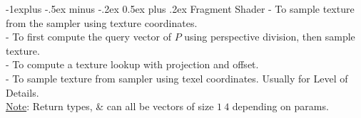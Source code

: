 \documentclass[10pt,landscape,letterpaper]{article}
\makeatletter
\renewcommand{\subsection}{\@startsection{subsection}{2}{0mm}%
                                {-1explus -.5ex minus -.2ex}%
                                {0.5ex plus .2ex}%
                                {\sffamily\normalsize\itshape}}
\makeatother
\begin{document}
\begin{multicols}{3}
\subsection{Fragment Shader}
 - To sample texture from the sampler using texture coordinates.
\\
 - To first compute the query vector of $P$ using perspective division, then sample texture.
\\
 - To compute a texture lookup with projection and offset.
\\
 - To sample texture from sampler using texel coordinates. Usually  for Level of Details.
\\
\underline{Note}: Return types,  \&  can all be vectors of size $1~4$ depending on params.

% 





\end{multicols}
\end{document}
